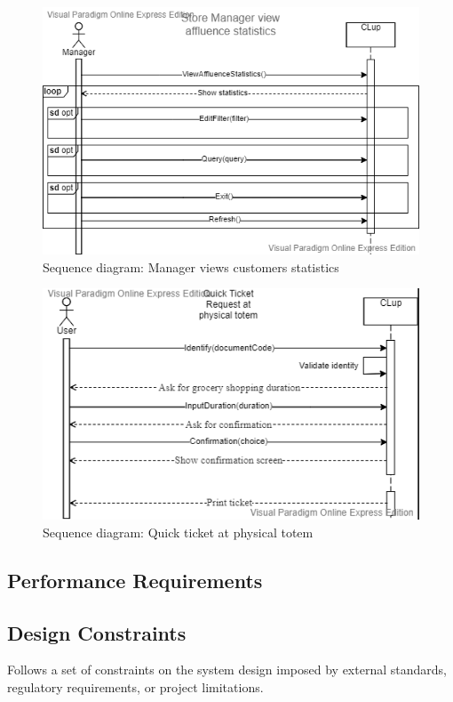 \begin{figure}[H]
	\includegraphics[width=\linewidth]{../Diagrams/ViewStatistics.png}
	\caption{Sequence diagram: Manager views customers statistics}
	\label{fig:Stat}
\end{figure} 

\begin{figure}[H]
	\includegraphics[width=\linewidth]{../Diagrams/Totem.png}
	\caption{Sequence diagram: Quick ticket at physical totem}
	\label{fig:Totem}
\end{figure} 


\subsection{Performance Requirements}

\subsection{Design Constraints}
Follows a set of constraints on the system design imposed by external standards, regulatory requirements, or project
limitations.

